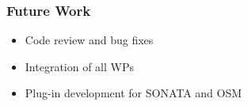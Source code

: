 \begin{frame}
\frametitle{Future Work}

\begin{itemize}
	\item Code review and bug fixes
	\item Integration of all WPs
	\item Plug-in development for SONATA and OSM
	
\end{itemize}

\end{frame}